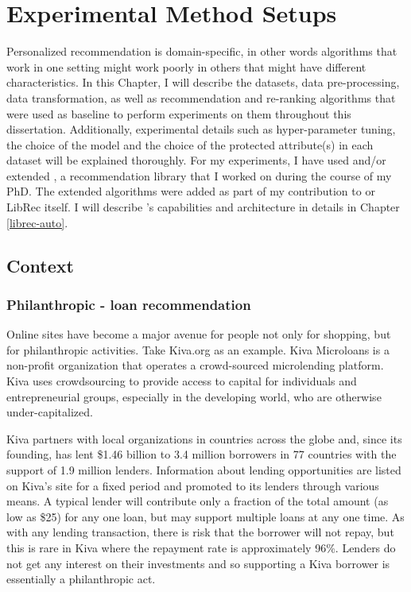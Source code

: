 \chapter{Experimental Method Setups}
\label{chap:methodology}

Personalized recommendation is domain-specific, in other words algorithms that work in one setting might work poorly in others that might have different characteristics. \cite{}
In this Chapter, I will describe the datasets, data pre-processing, data transformation, as well as recommendation and re-ranking algorithms that were used as baseline to perform experiments on them throughout this dissertation. 
Additionally, experimental details such as hyper-parameter tuning, the choice of the model and the choice of the protected attribute(s) in each dataset will be explained thoroughly. For my experiments, I have used and/or extended \libauto{}, a recommendation library that I worked on during the course of my PhD. The extended algorithms were added as part of my contribution to \libauto{} or LibRec itself. I will describe \libauto{}'s capabilities and architecture in details in Chapter \ref{librec-auto}.



\section{Context}
    \subsection{Philanthropic - loan recommendation}
    
    Online sites have become a major avenue for people not only for shopping, but for philanthropic activities. Take Kiva.org as an example. Kiva Microloans is a non-profit organization that operates a crowd-sourced microlending platform. Kiva uses crowdsourcing to provide access to capital for individuals and entrepreneurial groups, especially in the developing world, who are otherwise under-capitalized.
    
    Kiva partners with local organizations in countries across the globe and, since its founding, has lent \$1.46 billion to 3.4 million borrowers in 77 countries with the support of 1.9 million lenders. Information about lending opportunities are listed on Kiva's site for a fixed period and promoted to its lenders through various means. A typical lender will contribute only a fraction of the total amount (as low as \$25) for any one loan, but may support multiple loans at any one time. As with any lending transaction, there is risk that the borrower will not repay, but this is rare in Kiva where the repayment rate is approximately 96\%. Lenders do not get any interest on their investments and so supporting a Kiva borrower is essentially a philanthropic act.

